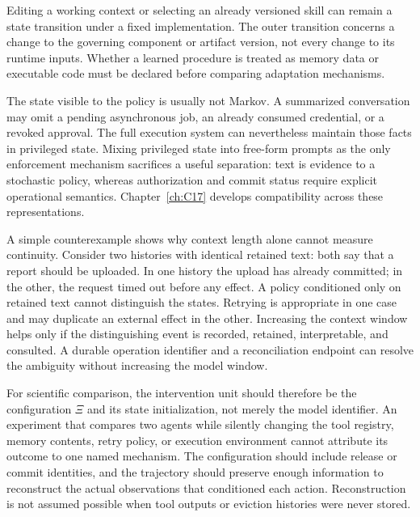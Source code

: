 Editing a working context or selecting an already versioned skill can remain a state transition under a fixed implementation. The outer transition concerns a change to the governing component or artifact version, not every change to its runtime inputs. Whether a learned procedure is treated as memory data or executable code must be declared before comparing adaptation mechanisms.

The state visible to the policy is usually not Markov. A summarized conversation may omit a pending asynchronous job, an already consumed credential, or a revoked approval. The full execution system can nevertheless maintain those facts in privileged state. Mixing privileged state into free-form prompts as the only enforcement mechanism sacrifices a useful separation: text is evidence to a stochastic policy, whereas authorization and commit status require explicit operational semantics. Chapter~\ref{ch:C17} develops compatibility across these representations.

A simple counterexample shows why context length alone cannot measure continuity. Consider two histories with identical retained text: both say that a report should be uploaded. In one history the upload has already committed; in the other, the request timed out before any effect. A policy conditioned only on retained text cannot distinguish the states. Retrying is appropriate in one case and may duplicate an external effect in the other. Increasing the context window helps only if the distinguishing event is recorded, retained, interpretable, and consulted. A durable operation identifier and a reconciliation endpoint can resolve the ambiguity without increasing the model window.

For scientific comparison, the intervention unit should therefore be the configuration $\Xi$ and its state initialization, not merely the model identifier. An experiment that compares two agents while silently changing the tool registry, memory contents, retry policy, or execution environment cannot attribute its outcome to one named mechanism. The configuration should include release or commit identities, and the trajectory should preserve enough information to reconstruct the actual observations that conditioned each action. Reconstruction is not assumed possible when tool outputs or eviction histories were never stored.

